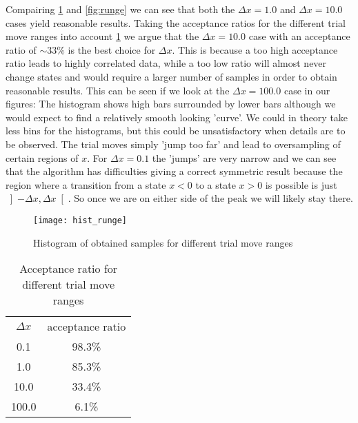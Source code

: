 \documentclass[a4paper,11pt,bibtotoc]{scrartcl}
\begin{document}
Compairing \cref{fig:hist_runge} and \cref{fig:runge} we can see that both
the $\Delta x = 1.0$ and $\Delta x = 10.0$ cases yield reasonable results.
Taking the acceptance ratios for the different trial move ranges into account
\cref{tab:acceptance} we argue that the $\Delta x = 10.0$ case with an acceptance
ratio of $\sim 33\%$ is the best choice for $\Delta x$.
This is because a too high acceptance ratio leads to highly correlated data,
while a too low ratio will almost never change states and would require
a larger number of samples in order to obtain reasonable results.
This can be seen if we look at the $\Delta x = 100.0$ case in our figures:
The histogram shows high bars surrounded by lower bars although we would expect
to find a relatively smooth looking 'curve'.
We could in theory take less bins for the histograms, but this could be unsatisfactory
when details are to be observed. The trial moves simply 'jump too far'
and lead to oversampling of certain regions of $x$.
For $\Delta x = 0.1$ the 'jumps' are very narrow and we can see that the algorithm
has difficulties giving a correct symmetric result because the region where a transition
from a state $x<0$ to a state $x>0$ is possible is just $\left]-\Delta x, \Delta x \right[$.
So once we are on either side of the peak we will likely stay there.

\begin{figure}[htb]
  \centering
  \texttt{[image: hist\_runge]}
  \caption{Histogram of obtained samples for different trial move ranges}
  \label{fig:hist_runge}
\end{figure}

\begin{table}
  \centering
  \begin{tabular}{c | c}
    $\Delta x$ & acceptance ratio \\
    0.1 & 98.3\% \\
    1.0 & 85.3\% \\
    10.0 & 33.4\% \\
    100.0 & 6.1\%
  \end{tabular}
 \caption{Acceptance ratio for different trial move ranges}
 \label{tab:acceptance}
\end{table}
\end{document}
